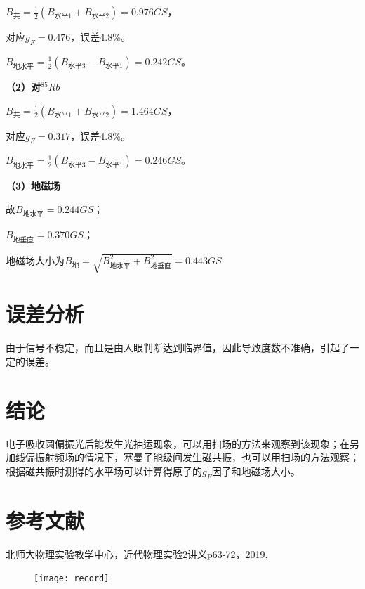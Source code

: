 \documentclass[UTF8]{ctexart}
\begin{document}
$B_{\mbox{共}}=\frac{1}{2}(B_{\mbox{水平1}}+B_{\mbox{水平2}})=0.976GS$，

对应$g_F=0.476$，误差4.8\%。

$B_{\mbox{地水平}}=\frac{1}{2}(B_{\mbox{水平3}}-B_{\mbox{水平1}})=0.242GS$。

\textbf{（2）对$^{85}Rb$}

$B_{\mbox{共}}=\frac{1}{2}(B_{\mbox{水平1}}+B_{\mbox{水平2}})=1.464GS$，

对应$g_F=0.317$，误差4.8\%。

$B_{\mbox{地水平}}=\frac{1}{2}(B_{\mbox{水平3}}-B_{\mbox{水平1}})=0.246GS$。

\textbf{（3）地磁场}

故$B_{\mbox{地水平}}=0.244GS$；

$B_{\mbox{地垂直}}=0.370GS$；

地磁场大小为$B_{\mbox{地}}=\sqrt{B_{\mbox{地水平}}^{2}+B_{\mbox{地垂直}}^{2}}=0.443GS$

\section{误差分析}
由于信号不稳定，而且是由人眼判断达到临界值，因此导致度数不准确，引起了一定的误差。

\section{结论}
电子吸收圆偏振光后能发生光抽运现象，可以用扫场的方法来观察到该现象；在另加线偏振射频场的情况下，塞曼子能级间发生磁共振，也可以用扫场的方法观察；根据磁共振时测得的水平场可以计算得原子的$g_F$因子和地磁场大小。

\section{参考文献}
\small
\noindent[1]北师大物理实验教学中心，近代物理实验2讲义p63-72，2019.
\begin{figure}[H]
\centering
\texttt{[image: record]}
\end{figure}
\end{document}
